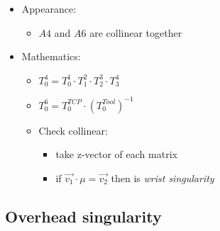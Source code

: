 \documentclass[professionalfonts, 
               xcolor={ usenames, %
                        dvipsnames,%
                        svgnames,%
                        table,%
                        hyperref%
                      }
              ]{beamer}
\begin{document}
\begin{frame}
\begin{itemize}
\item Appearance:
  \begin{itemize}
  \item $A4$ and $A6$ are collinear together
  \end{itemize}
  \item Mathematics:
    \begin{itemize}
    \item $T_{0}^{4} = T_{0}^{1} \cdot T_{1}^{2} \cdot T_{2}^{3} \cdot T_{3}^{4}$         
    \item $T_{0}^{6} = T_{0}^{TCP} \cdot (T_{0}^{Tool})^{-1}$
    \item Check collinear:
    \begin{itemize}
    \item take z-vector of each matrix
    \item if $\vec{v_1} \cdot \mu = \vec{v_2}$ then is \emph{wrist singularity}
    \end{itemize}
  \end{itemize}
\end{itemize}
\end{frame}

\begin{frame}[fragile]

\end{frame}

\subsection{Overhead singularity}
\begin{frame}
  \centering{}
\end{frame}
\end{document}
